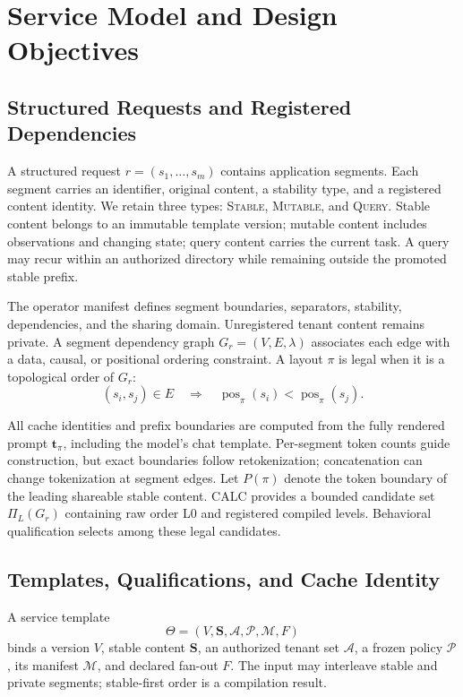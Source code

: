 \section{Service Model and Design Objectives}
\label{sec:model}

\subsection{Structured Requests and Registered Dependencies}
A structured request $r=(s_1,\ldots,s_m)$ contains application segments. Each segment carries an identifier, original content, a stability type, and a registered content identity. We retain three types: \textsc{Stable}, \textsc{Mutable}, and \textsc{Query}. Stable content belongs to an immutable template version; mutable content includes observations and changing state; query content carries the current task. A query may recur within an authorized directory while remaining outside the promoted stable prefix.

The operator manifest defines segment boundaries, separators, stability, dependencies, and the sharing domain. Unregistered tenant content remains private. A segment dependency graph $G_r=(V,E,\lambda)$ associates each edge with a data, causal, or positional ordering constraint. A layout $\pi$ is legal when it is a topological order of $G_r$:
\begin{equation}
 (s_i,s_j)\in E\quad\Longrightarrow\quad
 \operatorname{pos}_{\pi}(s_i)<\operatorname{pos}_{\pi}(s_j).
\end{equation}

All cache identities and prefix boundaries are computed from the fully rendered prompt $\mathbf{t}_{\pi}$, including the model's chat template. Per-segment token counts guide construction, but exact boundaries follow retokenization; concatenation can change tokenization at segment edges. Let $P(\pi)$ denote the token boundary of the leading shareable stable content. CALC provides a bounded candidate set $\Pi_L(G_r)$ containing raw order L0 and registered compiled levels. Behavioral qualification selects among these legal candidates.

\subsection{Templates, Qualifications, and Cache Identity}
A service template
\begin{equation}
 \Theta=(V,\mathbf S,\mathcal A,\mathcal P,\mathcal M,F)
\end{equation}
binds a version $V$, stable content $\mathbf S$, an authorized tenant set $\mathcal A$, a frozen policy $\mathcal P$, its manifest $\mathcal M$, and declared fan-out $F$. The input may interleave stable and private segments; stable-first order is a compilation result.

